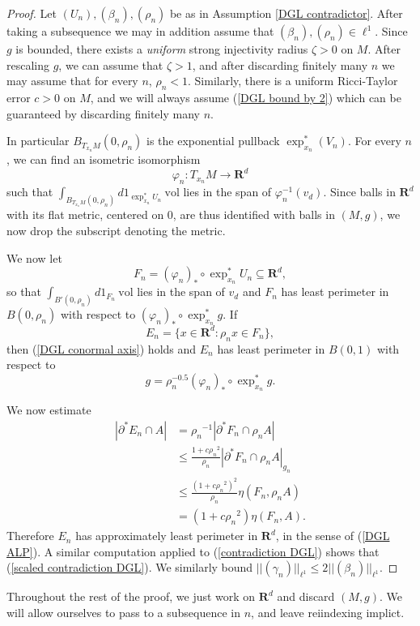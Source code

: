 \documentclass[reqno,12pt,letterpaper]{amsart}
\newcommand{\RR}{\mathbf{R}}
\newcommand{\vol}{\mathrm{vol}}
\theoremstyle{definition}
\numberwithin{equation}{section}
\begin{document}
\begin{proof}
Let $(U_n),(\beta_n),(\rho_n)$ be as in Assumption \ref{DGL contradictor}.
After taking a subsequence we may in addition assume that $(\beta_n),(\rho_n) \in \ell^1$.
Since $g$ is bounded, there exists a \emph{uniform} strong injectivity radius $\zeta > 0$ on $M$.
After rescaling $g$, we can assume that $\zeta > 1$, and after discarding finitely many $n$ we may assume that for every $n$, $\rho_n < 1$.
Similarly, there is a uniform Ricci-Taylor error $c > 0$ on $M$, and we will always assume (\ref{DGL bound by 2})
which can be guaranteed by discarding finitely many $n$.

In particular $B_{T_{x_n}M}(0, \rho_n)$ is the exponential pullback $\exp_{x_n}^*(V_n)$.
For every $n$, we can find an isometric isomorphism
$$\varphi_n: T_{x_n}M \to \RR^d$$
such that $\int_{B_{T_{x_n}M}(0, \rho_n)} d1_{\exp_{x_n}^* U_n} ~\vol$ lies in the span of $\varphi_n^{-1}(v_d)$.
Since balls in $\RR^d$ with its flat metric, centered on $0$, are thus identified with balls in $(M, g)$, we now drop the subscript denoting the metric.

We now let
$$F_n = (\varphi_n)_* \circ \exp_{x_n}^* U_n \subseteq \RR^d,$$
so that $\int_{B'(0, \rho_n)} d1_{F_n} ~\vol$ lies in the span of $v_d$ and $F_n$ has least perimeter in $B(0, \rho_n)$ with respect to $(\varphi_n)_* \circ \exp_{x_n}^* g$.
If
$$E_n = \{x \in \RR^d: \rho_n x \in F_n\},$$ then (\ref{DGL conormal axis}) holds
and $E_n$ has least perimeter in $B(0, 1)$ with respect to
$$g = \rho_n^{-0.5} (\varphi_n)_* \circ \exp_{x_n}^* g.$$

We now estimate
\begin{align*}
|\partial^* E_n \cap A| &= {\rho_n}^{-1} |\partial^* F_n \cap \rho_n A|\\
&\leq \frac{1 + c{\rho_n}^2}{\rho_n} |\partial^* F_n \cap \rho_n A|_{g_n}\\
&\leq \frac{(1 + c{\rho_n}^2)^2}{\rho_n} \eta(F_n, \rho_n A)\\
&= (1 + c{\rho_n}^2) \eta(F_n, A).
\end{align*}
Therefore $E_n$ has approximately least perimeter in $\RR^d$, in the sense of (\ref{DGL ALP}).
A similar computation applied to (\ref{contradiction DGL}) shows that (\ref{scaled contradiction DGL}).
We similarly bound $||(\gamma_n)||_{\ell^1} \leq 2 ||(\beta_n)||_{\ell^1}$.
\end{proof}

Throughout the rest of the proof, we just work on $\RR^d$ and discard $(M, g)$.
We will allow ourselves to pass to a subsequence in $n$, and leave reiindexing implict.
\end{document}
